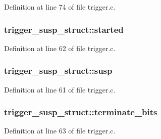 Definition at line 74 of file trigger.\+c.

\subsubsection[{\texorpdfstring{started}{started}}]{ trigger\+\_\+susp\+\_\+struct\+::started}\hypertarget{structtrigger__susp__struct_ab00d9df745d6d4cc5689b41a7a82cfaf}{}\label{structtrigger__susp__struct_ab00d9df745d6d4cc5689b41a7a82cfaf}


Definition at line 62 of file trigger.\+c.

\subsubsection[{\texorpdfstring{susp}{susp}}]{ trigger\+\_\+susp\+\_\+struct\+::susp}\hypertarget{structtrigger__susp__struct_a1c993fa171691590b7e9cbddeaec9d8c}{}\label{structtrigger__susp__struct_a1c993fa171691590b7e9cbddeaec9d8c}


Definition at line 61 of file trigger.\+c.

\subsubsection[{\texorpdfstring{terminate\+\_\+bits}{terminate_bits}}]{ trigger\+\_\+susp\+\_\+struct\+::terminate\+\_\+bits}\hypertarget{structtrigger__susp__struct_a8c694a5a1bbdc9063b7989f4d4e8229c}{}\label{structtrigger__susp__struct_a8c694a5a1bbdc9063b7989f4d4e8229c}


Definition at line 63 of file trigger.\+c.

